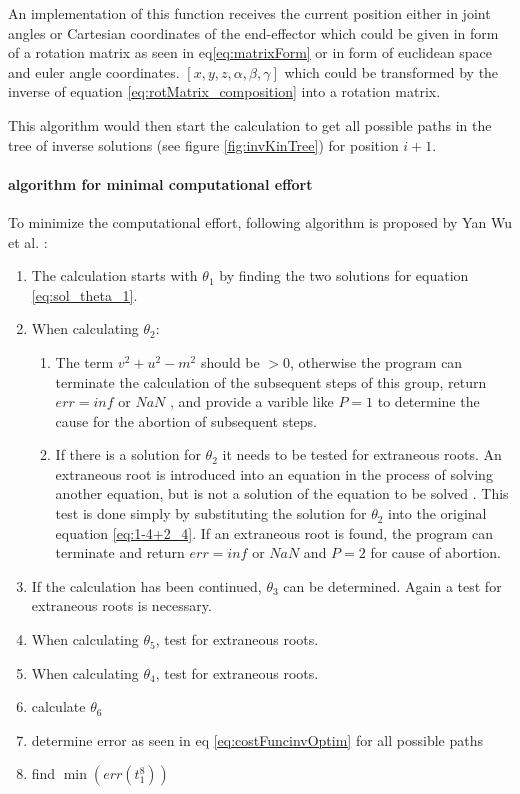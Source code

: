 An implementation of this function receives the current position either in joint angles or Cartesian coordinates of the end-effector which could be given in form of a rotation matrix as seen in eq\ref{eq:matrixForm} or in form of euclidean space and euler angle coordinates. $[x,y,z, \alpha, \beta, \gamma]$ which could be transformed by the inverse of equation \ref{eq:rotMatrix_composition} into a rotation matrix.

This algorithm would then start the calculation to get all possible paths in the tree of inverse solutions (see figure \ref{fig:invKinTree}) for position ${i+1}$.

\paragraph{algorithm for minimal computational effort}

To minimize the computational effort, following algorithm is proposed by Yan Wu et al. \cite{invKinSolYanWu}:

\begin{enumerate}
	\item The calculation starts with $\theta_1$ by finding the two solutions for equation \ref{eq:sol_theta_1}.
	\item When calculating $\theta_2$:
	\begin{enumerate}
		\item  The term $ v^2 + u^2 - m^2 $ should be $ > 0$, otherwise the program can terminate the calculation of the subsequent steps of this group, return $err = inf $ or $NaN $ , and provide a varible like $P=1$ to determine the cause for the abortion of subsequent steps.
		\item If there is a solution for $\theta_2$ it needs to be tested for extraneous roots. An extraneous root is  introduced into an equation in the process of solving another equation, but is not a solution of the equation to be solved \cite{extraneousroot}. This test is done simply by substituting the solution for $\theta_2$ into the original equation \ref{eq:1-4+2_4}. If an extraneous root is found, the program can terminate and return $err = inf$ or $ NaN$  and $P=2$ for cause of abortion. 
	\end{enumerate}
	\item If the calculation has been continued, $\theta_3$ can be determined. Again a test for extraneous roots is necessary.
	\item When calculating $\theta_5$, test for extraneous roots.
	\item When calculating $\theta_4$, test for extraneous roots.
	\item calculate $\theta_6$
	\item determine error as seen in eq \ref{eq:costFuncinvOptim} for all possible paths
	\item find $\min ( err(t_1^8))$ 
\end{enumerate}

